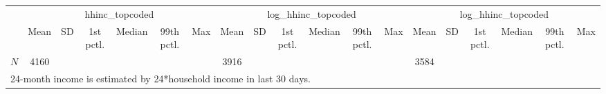 {
\def\sym#1{\ifmmode^{#1}\else\(^{#1}\)\fi}
\begin{tabular}{l*{3}{cccccc}}
\hline\hline
            &\multicolumn{6}{c}{hhinc\_topcoded}                                           &\multicolumn{6}{c}{log\_hhinc\_topcoded}                                       &\multicolumn{6}{c}{log\_hhinc\_topcoded}                                       \\
            &        Mean&          SD&   1st pctl.&      Median&  99th pctl.&         Max&        Mean&          SD&   1st pctl.&      Median&  99th pctl.&         Max&        Mean&          SD&   1st pctl.&      Median&  99th pctl.&         Max\\
\hline
\hline
\(N\)       &        4160&            &            &            &            &            &        3916&            &            &            &            &            &        3584&            &            &            &            &            \\
\hline\hline
\multicolumn{19}{l}{\footnotesize 24-month income is estimated by 24*household income in last 30 days.}\\
\end{tabular}
}
